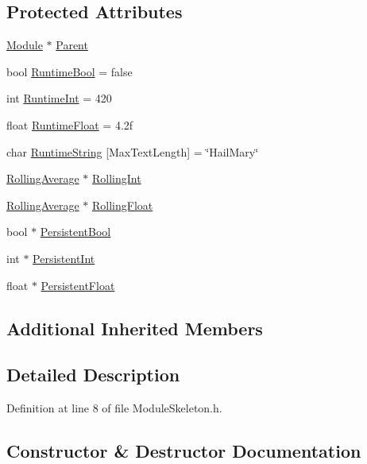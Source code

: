 \subsection*{Protected Attributes}
\begin{DoxyCompactItemize}
\item 
\hyperlink{class_module}{Module} $\ast$ \hyperlink{class_module_skeleton_a19e516bf8a16be02bb3b41c457a215bd}{Parent}
\item 
bool \hyperlink{class_module_skeleton_a35f805dbca9d18fa01eb08aaddb86284}{Runtime\+Bool} = false
\item 
int \hyperlink{class_module_skeleton_a12b393d156b504dfb7c63fe9c5ae359c}{Runtime\+Int} = 420
\item 
float \hyperlink{class_module_skeleton_acb206ae4738d39f94ab7aa9a9c3ebcd3}{Runtime\+Float} = 4.\+2f
\item 
char \hyperlink{class_module_skeleton_a575b21af4708a8923bef6e894f269790}{Runtime\+String} \mbox{[}Max\+Text\+Length\mbox{]} = \char`\"{}Hail\+Mary\char`\"{}
\item 
\hyperlink{class_rolling_average}{Rolling\+Average} $\ast$ \hyperlink{class_module_skeleton_a0d08aa449daebcebdf8d356d179fa2c2}{Rolling\+Int}
\item 
\hyperlink{class_rolling_average}{Rolling\+Average} $\ast$ \hyperlink{class_module_skeleton_ac51d22ec373d911fff125dfa0ec50317}{Rolling\+Float}
\item 
bool $\ast$ \hyperlink{class_module_skeleton_abb8a87bea241d6584fbd46792a2e08e2}{Persistent\+Bool}
\item 
int $\ast$ \hyperlink{class_module_skeleton_a844415f613ab3810610ea660b58e02a0}{Persistent\+Int}
\item 
float $\ast$ \hyperlink{class_module_skeleton_aa1a2e05abce5c79169f863ba87a0df26}{Persistent\+Float}
\end{DoxyCompactItemize}
\subsection*{Additional Inherited Members}


\subsection{Detailed Description}


Definition at line 8 of file Module\+Skeleton.\+h.



\subsection{Constructor \& Destructor Documentation}
\mbox{\label{class_module_skeleton_a28db770cfd6d6a02110d0adb62666676}} 

